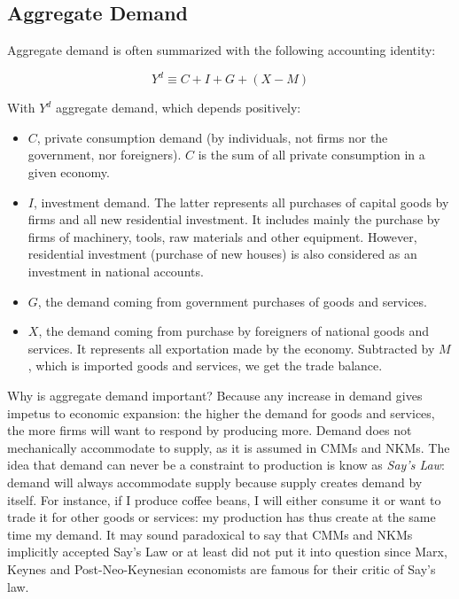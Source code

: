 \documentclass[
  letterpaper,
  DIV=11,
  numbers=noendperiod]{scrreprt}
\begin{document}
\hypertarget{aggregate-demand}{%
\subsection{Aggregate Demand}\label{aggregate-demand}}

Aggregate demand is often summarized with the following accounting
identity:

\[Y^d \equiv C+I+G+(X-M)\]

With \(Y^d\) aggregate demand, which depends positively:

\begin{itemize}
\item
  \(C\), private consumption demand (by individuals, not firms nor the
  government, nor foreigners). \(C\) is the sum of all private
  consumption in a given economy.
\item
  \(I\), investment demand. The latter represents all purchases of
  capital goods by firms and all new residential investment. It includes
  mainly the purchase by firms of machinery, tools, raw materials and
  other equipment. However, residential investment (purchase of new
  houses) is also considered as an investment in national accounts.
\item
  \(G\), the demand coming from government purchases of goods and
  services.
\item
  \(X\), the demand coming from purchase by foreigners of national goods
  and services. It represents all exportation made by the economy.
  Subtracted by \(M\), which is imported goods and services, we get the
  trade balance.
\end{itemize}

Why is aggregate demand important? Because any increase in demand gives
impetus to economic expansion: the higher the demand for goods and
services, the more firms will want to respond by producing more. Demand
does not mechanically accommodate to supply, as it is assumed in CMMs
and NKMs. The idea that demand can never be a constraint to production
is know as \emph{Say's Law}: demand will always accommodate supply
because supply creates demand by itself. For instance, if I produce
coffee beans, I will either consume it or want to trade it for other
goods or services: my production has thus create at the same time my
demand. It may sound paradoxical to say that CMMs and NKMs implicitly
accepted Say's Law or at least did not put it into question since Marx,
Keynes and Post-Neo-Keynesian economists are famous for their critic of
Say's law.
\end{document}
